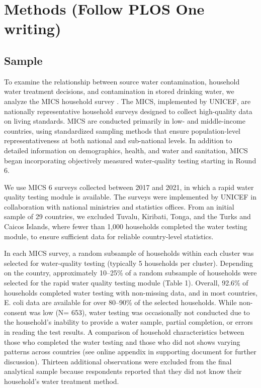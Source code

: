 \documentclass [11pt]{article}
\theoremstyle{plain}
\theoremstyle{definition}
\theoremstyle{remark}
\newcommand{\1}{\bm{1}}
\begin{document}
\section{Methods (Follow PLOS One writing)} 
\subsection{Sample} 
To examine the relationship between source water contamination, household water treatment decisions, and contamination in stored drinking water, we analyze the MICS household survey  \citep{mics_ecoli}. The MICS, implemented by UNICEF, are nationally representative household surveys designed to collect high-quality data on living standards. MICS are conducted primarily in low- and middle-income countries, using standardized sampling methods that ensure population-level representativeness at both national and sub-national levels. In addition to detailed information on demographics, health, and water and sanitation, MICS began incorporating objectively measured water-quality testing starting in Round 6.

We use MICS 6 surveys collected between 2017 and 2021, in which a rapid water quality testing module is available. The surveys were implemented by UNICEF in collaboration with national ministries and statistics offices. From an initial sample of 29 countries, we excluded Tuvalu, Kiribati, Tonga, and the Turks and Caicos Islands, where fewer than 1,000 households completed the water testing module, to ensure sufficient data for reliable country-level statistics.

In each MICS survey, a random subsample of households within each cluster was selected for water-quality testing (typically 5 households per cluster). Depending on the country, approximately 10–25\% of a random subsample of households were selected for the rapid water quality testing module (Table 1). Overall, 92.6\% of households completed water testing with non-missing data, and in most countries, E. coli data are available for over 80–90\% of the selected households. While non-consent was low (N= 653), water testing was occasionally not conducted due to the household’s inability to provide a water sample, partial completion, or errors in reading the test results. A comparison of household characteristics between those who completed the water testing and those who did not shows varying patterns across countries  (see online appendix in supporting document for further discussion). Thirteen additional observations were excluded from the final analytical sample because respondents reported that they did not know their household’s water treatment method.
\end{document}
